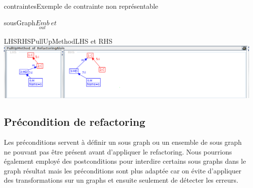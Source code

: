 \documentclass[a4paper, 12pt]{article}
\begin{document}
\begin{figu}{contraintes}{Exemple de contrainte non représentable}
\begin{myfig}{sousGraph}{$\underset{out}{Emb} ~ et ~ $}

  \end{myfig}


  \begin{myfig}{LHSRHSPullUpMethod}{LHS et RHS}
    \includegraphics[width=\textwidth]{LHSRHSPullUpMethod.png}
  \end{myfig}

  \subsection{Précondition de refactoring}
  Les préconditions servent à définir un sous graph ou un ensemble de sous graph ne pouvant pas être présent avant d'appliquer le refactoring.
  Nous pourrions également employé des postconditions pour interdire certains sous graphs dans le graph résultat
  mais les préconditions sont plus adaptée car on évite d'appliquer des transformations sur un graphs et ensuite seulement de détecter les erreurs.


\end{figu}
\end{document}
